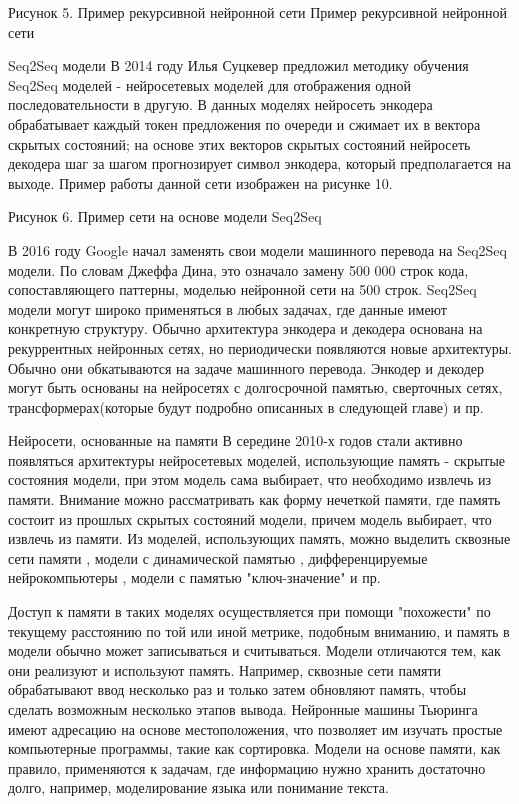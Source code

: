 Рисунок 5. Пример рекурсивной нейронной сети
Пример рекурсивной нейронной сети

Seq2Seq  модели
     В 2014 году Илья Суцкевер предложил методику обучения Seq2Seq моделей \cite{Sutskever_Vinyals_Le_2014} - нейросетевых моделей для отображения одной последовательности в другую. В данных моделях нейросеть энкодера обрабатывает каждый токен предложения по очереди  и сжимает их в вектора скрытых состояний; на основе этих векторов скрытых состояний нейросеть декодера шаг за шагом прогнозирует символ энкодера, который предполагается на выходе. Пример работы данной сети изображен на рисунке 10.

Рисунок 6. Пример сети на основе модели Seq2Seq


    В 2016 году Google начал заменять свои модели машинного перевода на Seq2Seq модели. По словам Джеффа Дина, это означало замену 500 000 строк кода, сопоставляющего паттерны,  моделью нейронной сети на 500 строк. Seq2Seq модели могут широко применяться в любых задачах, где данные имеют конкретную структуру.
Обычно архитектура энкодера и декодера основана на рекуррентных нейронных сетях, но периодически появляются новые архитектуры. Обычно они обкатываются на задаче машинного перевода. Энкодер и декодер могут быть основаны на нейросетях с долгосрочной памятью, сверточных сетях, трансформерах(которые будут подробно описанных в следующей главе) и пр.

Нейросети, основанные на памяти
В середине 2010-х годов стали активно появляться архитектуры нейросетевых моделей, использующие память - скрытые состояния модели, при этом модель сама выбирает, что необходимо извлечь из памяти. 
     Внимание можно рассматривать как форму нечеткой памяти, где память состоит из прошлых скрытых состояний модели, причем модель выбирает, что извлечь из памяти.  Из моделей, использующих память, можно выделить сквозные сети памяти \cite{Sukhbaatar_Szlam_Weston_Fergus_2015}, модели с динамической памятью \cite{Kumar_Irsoy_Ondruska_Iyyer_Bradbury_Gulrajani_Zhong_Paulus_Socher_2016}, дифференцируемые нейрокомпьютеры \cite{Graves_Wayne_Reynolds_Harley_Danihelka_Grabska-Barwińska_Colmenarejo_Grefenstette_Ramalho_Agapiou_et al._2016}, модели с памятью "ключ-значение" \cite{Miller_Fisch_Dodge_Karimi_Bordes_Weston_2016} и пр.
 
     Доступ к памяти в таких моделях осуществляется при помощи "похожести" по текущему расстоянию по той или иной метрике, подобным вниманию, и память в модели обычно может записываться и считываться.  Модели отличаются тем, как они реализуют и используют память. Например, сквозные сети памяти обрабатывают ввод несколько раз и только затем обновляют память, чтобы сделать возможным несколько этапов вывода.  Нейронные машины Тьюринга имеют адресацию на основе местоположения, что позволяет им изучать простые компьютерные программы, такие как сортировка.  Модели на основе памяти, как правило, применяются к задачам, где информацию нужно хранить достаточно долго, например, моделирование языка или понимание текста.  



